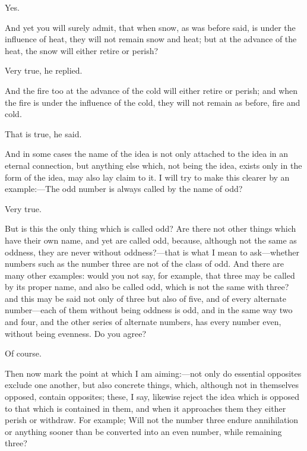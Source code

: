 \documentclass[11pt,letter]{article}
\begin{document}
\par  Yes.

\par  And yet you will surely admit, that when snow, as was before said, is under the influence of heat, they will not remain snow and heat; but at the advance of the heat, the snow will either retire or perish?

\par  Very true, he replied.

\par  And the fire too at the advance of the cold will either retire or perish; and when the fire is under the influence of the cold, they will not remain as before, fire and cold.

\par  That is true, he said.

\par  And in some cases the name of the idea is not only attached to the idea in an eternal connection, but anything else which, not being the idea, exists only in the form of the idea, may also lay claim to it. I will try to make this clearer by an example:—The odd number is always called by the name of odd?

\par  Very true.

\par  But is this the only thing which is called odd? Are there not other things which have their own name, and yet are called odd, because, although not the same as oddness, they are never without oddness?—that is what I mean to ask—whether numbers such as the number three are not of the class of odd. And there are many other examples: would you not say, for example, that three may be called by its proper name, and also be called odd, which is not the same with three? and this may be said not only of three but also of five, and of every alternate number—each of them without being oddness is odd, and in the same way two and four, and the other series of alternate numbers, has every number even, without being evenness. Do you agree?

\par  Of course.

\par  Then now mark the point at which I am aiming:—not only do essential opposites exclude one another, but also concrete things, which, although not in themselves opposed, contain opposites; these, I say, likewise reject the idea which is opposed to that which is contained in them, and when it approaches them they either perish or withdraw. For example; Will not the number three endure annihilation or anything sooner than be converted into an even number, while remaining three?
\end{document}
